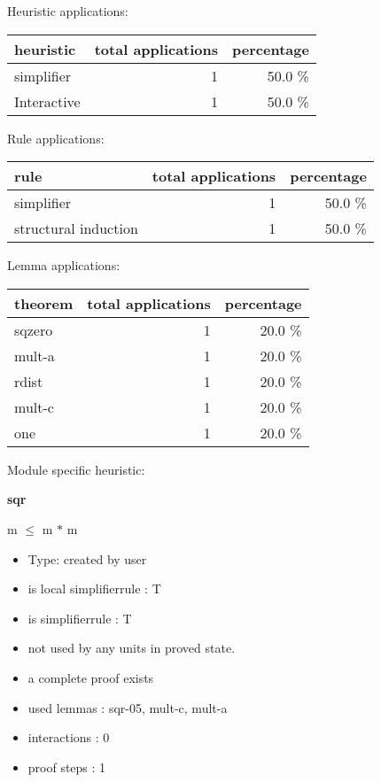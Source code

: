 \documentclass[a4paper]{article}
\begin{document}
Heuristic applications:

\begin{supertabular}{l|r|r}
heuristic	& total applications & percentage \\ \hline
simplifier & 1 & 50.0 \% \\
Interactive & 1 & 50.0 \% \\

\end{supertabular}

Rule applications:

\begin{supertabular}{l|r|r}
rule	        & total applications & percentage \\ \hline
simplifier & 1 & 50.0 \% \\
structural induction & 1 & 50.0 \% \\

\end{supertabular}

Lemma applications:

\begin{supertabular}{l|r|r}
theorem	        & total applications & percentage \\ \hline
sqzero & 1 & 20.0 \% \\
mult-a & 1 & 20.0 \% \\
rdist & 1 & 20.0 \% \\
mult-c & 1 & 20.0 \% \\
one & 1 & 20.0 \% \\

\end{supertabular}

Module specific heuristic:

\pagebreak

{\LARGE\bf sqr}\label{lemma-sqr}

\medskip

 \Fol m $\le$ m $*$ m

\begin{itemize}

\item Type: created by user

\item is local simplifierrule : T
\item is simplifierrule : T
\item not used by any units in proved state.
\item       a complete proof exists
\item       used lemmas  : sqr-05, mult-c, mult-a
\item       interactions : 0
\item       proof steps  : 1
\end{itemize}
\end{document}
